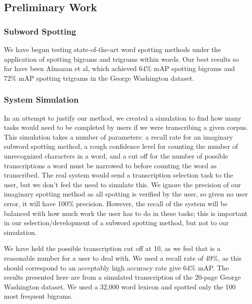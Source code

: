 \documentclass[ms]{byuprop}
\begin{document}

\subsection{Preliminary Work}

\subsubsection{Subword Spotting}
We have begun testing state-of-the-art word spotting methods under the application of spotting bigrams and trigrams within words. Our best results so far have been Almazan et al\cite{Almazan2014}, which achieved 64\% mAP spotting bigrams and 72\% mAP spotting trigrams in the George Washington dataset.

\subsubsection{System Simulation}
In an attempt to justify our method, we created a simulation to find how many tasks would need to be completed by users if we were transcribing a given corpus. This simulation takes a number of parameters: a recall rate for an imaginary subword spotting method, a rough confidence level for counting the number of unrecognized characters in a word, and a cut off for the number of possible transcriptions a word must be narrowed to before counting the word as transcribed. The real system would send a transcription selection task to the user, but we don't feel the need to simulate this. We ignore the precision of our imaginary spotting method as all spotting is verified by the user, so given no user error, it will have 100\% precision. However, the recall of the system will be balanced with how much work the user has to do in these tasks; this is important in our selection/development of a subword spotting method, but not to our simulation.

We have held the possible transcription cut off at 10, as we feel that is a reasonable number for a user to deal with. We used a recall rate of 49\%, as this should correspond to an acceptably high accuracy rate give 64\% mAP. The results presented here are from a simulated transcription of the 20-page George Washington dataset. We used a 32,000 word lexicon and spotted only the 100 most frequent bigrams.
\end{document}

